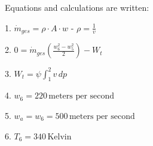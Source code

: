 Equations and calculations are written:  

1. \( \dot{m}_{ges} = \rho \cdot A \cdot w \)  
   - \( \rho = \frac{1}{v} \)  

2. \( 0 = \dot{m}_{ges} \left( \frac{w_6^2 - w_5^2}{2} \right) - W_t \)  

3. \( W_t = \psi \int_{1}^{2} v \, dp \)  

4. \( w_6 = 220 \, \text{meters per second} \)  

5. \( w_a = w_6 = 500 \, \text{meters per second} \)  

6. \( T_6 = 340 \, \text{Kelvin} \)